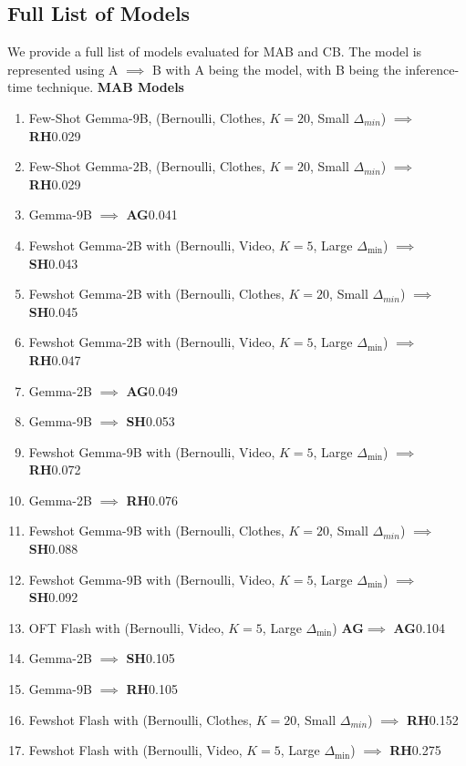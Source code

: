 \documentclass[11pt, logo]{googledeepmind}
\newcommand{\SH}{\textbf{SH}\xspace}
\newcommand{\RH}{\textbf{RH}\xspace}
\newcommand{\AG}{\textbf{AG}\xspace}
\newcommand{\OFT}{OFT\xspace}
\newcommand{\FSD}{Few-Shot\xspace}
\theoremstyle{plain}
\theoremstyle{definition}
\begin{document}
\subsection{Full List of Models}
\label{sec:app:model_full_list}
We provide a full list of models evaluated for MAB and CB. The model is represented using A $\implies$ B with A being the model, with B being the inference-time technique.
\textbf{MAB Models}
\begin{enumerate}
    \item \FSD Gemma-9B, (Bernoulli, Clothes, $K=20$, Small $\Delta_{min}$) $\implies$ \RH \hfill 0.029
    \item \FSD Gemma-2B, (Bernoulli, Clothes, $K=20$, Small $\Delta_{min}$) $\implies$ \RH \hfill 0.029
    \item Gemma-9B $\implies$ \AG \hfill 0.041
    \item Fewshot Gemma-2B with (Bernoulli, Video, $K=5$, Large $\Delta_{\min}$) $\implies$ \SH \hfill 0.043
    \item Fewshot Gemma-2B with  (Bernoulli, Clothes, $K=20$, Small $\Delta_{min}$) $\implies$ \SH \hfill 0.045
    \item Fewshot Gemma-2B with (Bernoulli, Video, $K=5$, Large $\Delta_{\min}$) $\implies$ \RH \hfill 0.047
    \item Gemma-2B $\implies$ \AG \hfill 0.049
    \item Gemma-9B $\implies$ \SH \hfill 0.053
    \item Fewshot Gemma-9B with (Bernoulli, Video, $K=5$, Large $\Delta_{\min}$) $\implies$ \RH \hfill 0.072
    \item Gemma-2B $\implies$ \RH \hfill 0.076
    \item Fewshot Gemma-9B with  (Bernoulli, Clothes, $K=20$, Small $\Delta_{min}$) $\implies$ \SH \hfill 0.088
    \item Fewshot Gemma-9B with (Bernoulli, Video, $K=5$, Large $\Delta_{\min}$) $\implies$ \SH \hfill 0.092
    \item \OFT Flash with (Bernoulli, Video, $K=5$, Large $\Delta_{\min}$) \AG $\implies$ \AG \hfill 0.104
    \item Gemma-2B $\implies$ \SH \hfill 0.105
    \item Gemma-9B $\implies$ \RH \hfill 0.105
    \item Fewshot Flash with  (Bernoulli, Clothes, $K=20$, Small $\Delta_{min}$) $\implies$ \RH \hfill 0.152
    \item Fewshot Flash with (Bernoulli, Video, $K=5$, Large $\Delta_{\min}$) $\implies$ \RH \hfill 0.275

\end{enumerate}
\end{document}
